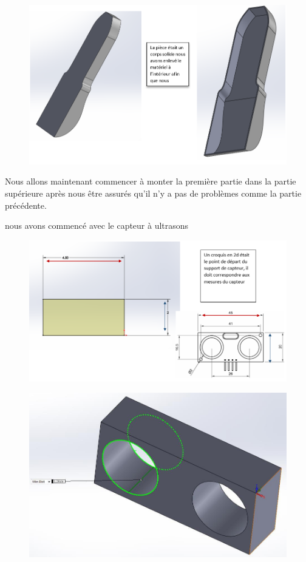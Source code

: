 \begin{figure}[!htbp]
    \centering
    \includegraphics[width=\linewidth]{assets/conception1/19.png}
\end{figure}

\FloatBarrier

Nous allons maintenant commencer à monter la première partie dans la partie supérieure après nous être assurés qu’il n’y a pas de problèmes comme la partie précédente.

nous avons commencé avec le capteur à ultrasons


\begin{figure}[!htbp]
    \centering
    \includegraphics[width=\linewidth]{assets/conception1/20.png}
\end{figure}

\begin{figure}[!htbp]
    \centering
    \includegraphics[width=\linewidth]{assets/conception1/img310.jpg}
\end{figure}

